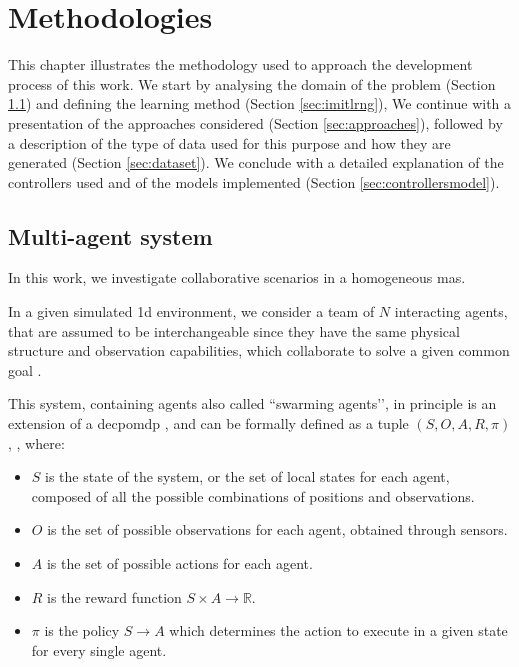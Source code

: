 \chapter{Methodologies}
\label{chap:methods}

This chapter illustrates the methodology used to approach the development 
process of this work. 
We start by analysing the domain of the problem (Section \ref{sec:MAS}) and 
defining the learning method (Section \ref{sec:imitlrng}), 
We continue with a presentation of the approaches considered (Section 
\ref{sec:approaches}), followed by  a description of the type of data used for this 
purpose and how they are generated (Section \ref{sec:dataset}).
We conclude with a detailed explanation of the controllers used and of the models
implemented (Section \ref{sec:controllersmodel}). 


\section{Multi-agent system}
\label{sec:MAS}

In this work, we investigate collaborative scenarios in a homogeneous \gls{mas}.

In a given simulated \gls{1d} environment, we consider a team of $N$ interacting 
agents, that are assumed to be interchangeable since they have the same physical 
structure and observation capabilities, which collaborate to solve a given common 
goal \cite[][]{stone2000multiagent, vsovsic2016inverse}.

This system, containing agents also called ``swarming agents’’, in principle is an 
extension of a \gls{decpomdp} \cite[][]{oliehoek2012decentralised}, and can be 
formally defined as a tuple $(S, O, A, R, \pi)$, \cite[see][]{schaal1999imitation}, 
where:
\begin{itemize}
	\item $S$ is the state of the system, or the set of local states for each agent, 
	composed of all the possible combinations of positions and observations.
	\item $O$ is the set of possible observations for each agent, obtained through 
	sensors.
	\item $A$ is the set of possible actions for each agent.
	\item $R$ is the reward function $S \times A \rightarrow \mathbb{R}$.
	\item $\pi$ is the policy $S \rightarrow A$ which determines the action to 
	execute in a given state for every single agent.
\end{itemize}

